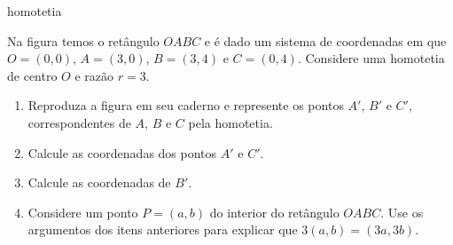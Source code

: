 




\begin{task}{ homotetia}
\label{ativ-vetores-homotetia}



Na figura temos o retângulo \(OABC\) e é dado um sistema de coordenadas em que \(O=(0,0)\), \(A=(3,0)\), \(B=(3,4)\) e \(C=(0,4)\).
Considere uma homotetia de centro \(O\) e razão \(r=3\).
\begin{center}
\end{center}\begin{enumerate}
\item {} 
Reproduza a figura em seu caderno e represente os pontos \(A'\), \(B'\) e \(C'\), correspondentes de \(A\), \(B\) e \(C\) pela homotetia.

\item {} 
Calcule as coordenadas dos pontos \(A'\) e \(C'\).

\item {} 
Calcule as coordenadas de \(B'\).

\item {} 
Considere um ponto \(P=(a,b)\) do interior do retângulo \(OABC\). Use os argumentos dos itens anteriores para explicar que \(3(a,b)=(3a,3b)\).

\end{enumerate}
\end{task}



